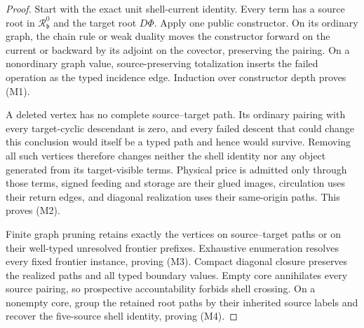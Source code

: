 \documentclass[11pt]{article}
\numberwithin{section}{part}
\theoremstyle{plain}
\theoremstyle{definition}
\theoremstyle{remark}
\begin{document}
\begin{proof}
Start with the exact unit shell-current identity.  Every term has a source
root in \(\mathscr R^0_{\mathfrak b}\) and the target root \(D\Phi\).  Apply
one public constructor.  On its ordinary graph, the chain rule or weak
duality moves the constructor forward on the current or backward by its
adjoint on the covector, preserving the pairing.  On a nonordinary graph
value, source-preserving totalization inserts the failed operation as the
typed incidence edge.  Induction over constructor depth proves
\textup{(M1)}.

A deleted vertex has no complete source--target path.  Its ordinary pairing
with every target-cyclic descendant is zero, and every failed descent that
could change this conclusion would itself be a typed path and hence would
survive.  Removing all such vertices therefore changes neither the shell
identity nor any object generated from its target-visible terms.  Physical
price is admitted only through those terms, signed feeding and storage are
their glued images, circulation uses their return edges, and diagonal
realization uses their same-origin paths.  This proves \textup{(M2)}.

Finite graph pruning retains exactly the vertices on source--target paths or
on their well-typed unresolved frontier prefixes.  Exhaustive enumeration
resolves every fixed frontier instance, proving \textup{(M3)}.  Compact
diagonal closure preserves the realized paths and all typed boundary values.
Empty core annihilates every source pairing,
so prospective accountability forbids shell crossing.  On a nonempty core,
group the retained root paths by their inherited source labels and recover
the five-source shell identity, proving \textup{(M4)}.
\end{proof}
\end{document}

